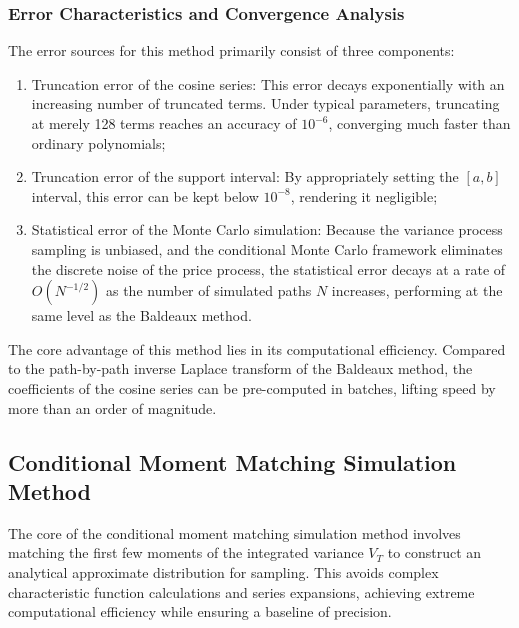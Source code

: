 \subsubsection{Error Characteristics and Convergence Analysis}
The error sources for this method primarily consist of three components:
\begin{enumerate}
  \item Truncation error of the cosine series: This error decays exponentially with an increasing number of truncated terms. Under typical parameters, truncating at merely 128 terms reaches an accuracy of $10^{-6}$, converging much faster than ordinary polynomials;
  \item Truncation error of the support interval: By appropriately setting the $[a,b]$ interval, this error can be kept below $10^{-8}$, rendering it negligible;
  \item Statistical error of the Monte Carlo simulation: Because the variance process sampling is unbiased, and the conditional Monte Carlo framework eliminates the discrete noise of the price process, the statistical error decays at a rate of $O(N^{-1/2})$ as the number of simulated paths $N$ increases, performing at the same level as the Baldeaux method.
\end{enumerate}
The core advantage of this method lies in its computational efficiency. Compared to the path-by-path inverse Laplace transform of the Baldeaux method, the coefficients of the cosine series can be pre-computed in batches, lifting speed by more than an order of magnitude.

\subsection{Conditional Moment Matching Simulation Method}
The core of the conditional moment matching simulation method involves matching the first few moments of the integrated variance $V_T$ to construct an analytical approximate distribution for sampling. This avoids complex characteristic function calculations and series expansions, achieving extreme computational efficiency while ensuring a baseline of precision.

